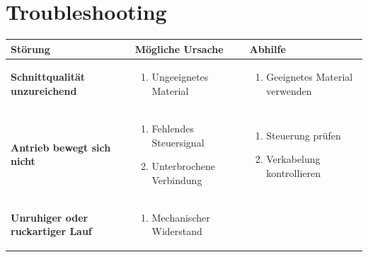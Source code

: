 %
%

\chapter{Troubleshooting}

\begin{table}[ht]
	\begin{tabular}{|p{5cm}|p{5cm}|p{}|}
		\hline
		\textbf{Störung} & \textbf{Mögliche Ursache} &\textbf{Abhilfe } \\ \hline
		\vspace{10pt}
		\centering
		\textbf{Schnittqualität unzureichend} &
		\vspace{-10pt}
		\begin{enumerate}
			\item Ungeeignetes Material
		\end{enumerate} &
		\vspace{-10pt}
		\begin{enumerate}
			\item Geeignetes Material verwenden
			\vspace{5pt}
		\end{enumerate} \\ \hline
		\vspace{10pt}
		\centering
		\textbf{Antrieb bewegt sich nicht} &
		\vspace{-10pt}
		\begin{enumerate}
			\item Fehlendes Steuersignal
			\item Unterbrochene Verbindung
		\end{enumerate} &
		\vspace{-10pt}
		\begin{enumerate}
			\item Steuerung prüfen
			\item Verkabelung kontrollieren
			\vspace{5pt}
		\end{enumerate} \\ \hline
		\vspace{10pt}
		\centering
		\textbf{Unruhiger oder ruckartiger Lauf} &
		\vspace{-10pt}
		\begin{enumerate}
			\item Mechanischer Widerstand

\end{enumerate}
\end{tabular}
\end{table}
